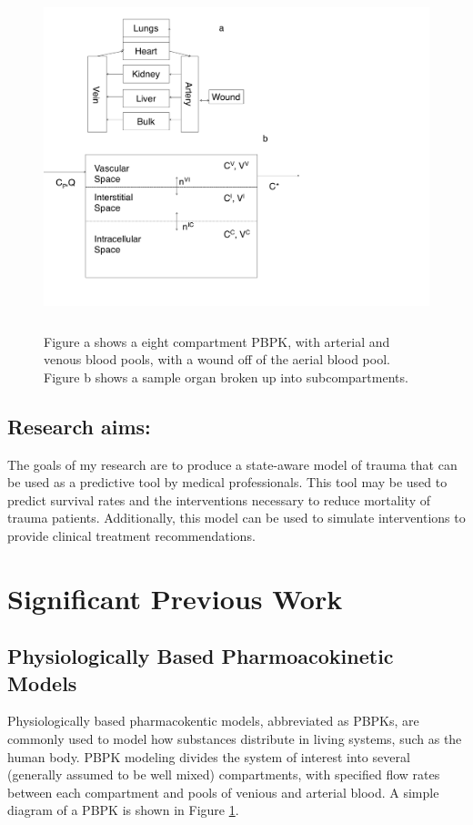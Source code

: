 \documentclass[12pt]{article}
\begin{document}
\begin{figure}
                \vspace{-20pt}
        \centering
        \includegraphics[height=10cm]{figures/bothbodyfigures}
         \vspace{-20pt}
        \caption{\scriptsize Figure a shows a eight compartment PBPK, with arterial and venous blood pools, with a wound off of the aerial blood pool. Figure b shows a sample organ broken up into subcompartments.}
                 \label{fig:SamplePBPK}
\end{figure} 
 
\subsection*{Research aims:} The goals of my research are to produce a state-aware model of trauma that can be used as a predictive tool by medical professionals. This tool may be used to predict survival rates and the interventions necessary to reduce mortality of trauma patients. Additionally, this model can be used to simulate interventions to provide clinical treatment recommendations.
\section*{Significant Previous Work}
\subsection*{Physiologically Based Pharmoacokinetic Models}
Physiologically based pharmacokentic models, abbreviated as PBPKs, are commonly used to model how substances distribute in living systems, such as the human body. PBPK modeling divides the system of interest into several (generally assumed to be well mixed) compartments, with specified flow rates between each compartment and pools of venious and arterial blood. A simple diagram of a PBPK is shown in Figure \ref{fig:SamplePBPK}. 
   
\end{document}
